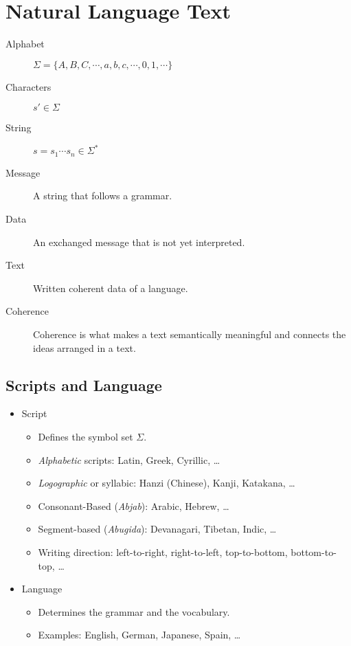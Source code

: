 \documentclass[a4paper, 11pt, accentcolor = tud3b]{tudreport}
\begin{document}
    \chapter{Natural Language Text} %
        \begin{description}
        	\item[Alphabet] \( \Sigma = \{ A, B, C, \cdots, a, b, c, \cdots, 0, 1, \cdots \} \)
        	\item[Characters] \( s'\in \Sigma \)
        	\item[String] \( s = s_1 \cdots s_n \in \Sigma^* \)
        	\item[Message] A string that follows a grammar.
        	\item[Data] An exchanged message that is not yet interpreted.
        	\item[Text] Written coherent data of a language.
        	\item[Coherence] Coherence is what makes a text semantically meaningful and connects the ideas arranged in a text.
        \end{description}

        \section{Scripts and Language} %
            \begin{itemize}
            	\item Script
            		\begin{itemize}
            			\item Defines the symbol set \( \Sigma \).
            			\item \textit{Alphabetic} scripts: Latin, Greek, Cyrillic, \dots
            			\item \textit{Logographic} or syllabic: Hanzi (Chinese), Kanji, Katakana, \dots
            			\item Consonant-Based (\textit{Abjab}): Arabic, Hebrew, \dots
            			\item Segment-based (\textit{Abugida}): Devanagari, Tibetan, Indic, \dots
            			\item Writing direction: left-to-right, right-to-left, top-to-bottom, bottom-to-top, \dots
            		\end{itemize}
            	\item Language
            		\begin{itemize}
            			\item Determines the grammar and the vocabulary.
            			\item Examples: English, German, Japanese, Spain, \dots
            		\end{itemize}
            \end{itemize}
\end{document}
